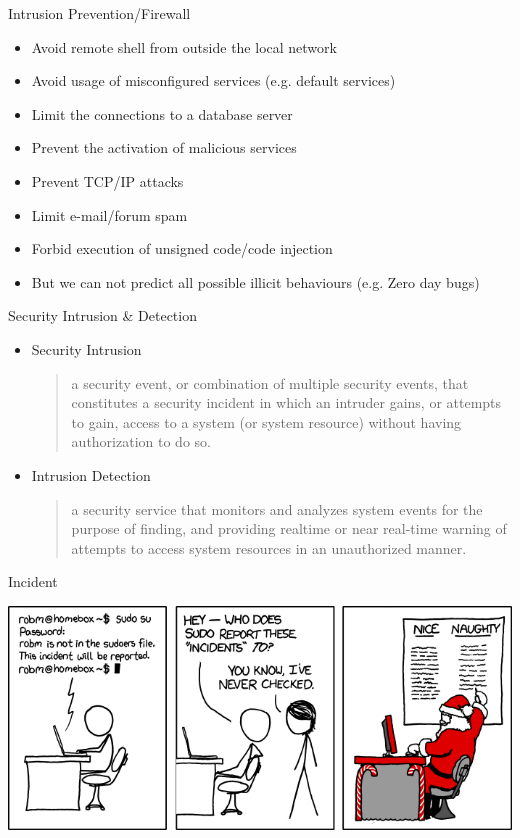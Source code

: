 \documentclass{beamer}
\begin{document}
\begin{frame}{Intrusion Prevention/Firewall}
  \begin{itemize}
  \item Avoid remote shell from outside the local network
  \item Avoid usage of misconfigured services (e.g. default services)
  \item Limit the connections to a database server
  \item Prevent the activation of malicious services
  \item Prevent TCP/IP attacks
  \item Limit e-mail/forum spam
  \item Forbid execution of unsigned code/code injection
  \item <2-> But we can not predict all possible illicit behaviours (e.g. Zero day bugs)
  \end{itemize}
\end{frame}

\begin{frame}{Security Intrusion \& Detection}
  \begin{itemize}
  \item Security Intrusion 
    \begin{quote}
a security event, or combination of multiple security 
events, that constitutes a security incident in which an 
intruder gains, or attempts to gain, access to a system 
(or system resource) without having authorization to do 
so. 
    \end{quote}
  \item Intrusion Detection
    
    \begin{quote}
a security service that monitors and analyzes system 
events for the purpose of finding, and providing realtime or near real-time warning of attempts to access 
system resources in an unauthorized manner.
    \end{quote}
  \end{itemize}
\end{frame}

\begin{frame}{Incident}
   \begin{center}
    \includegraphics[width=1\linewidth]{incident}
  \end{center}
\end{frame}
\end{document}
